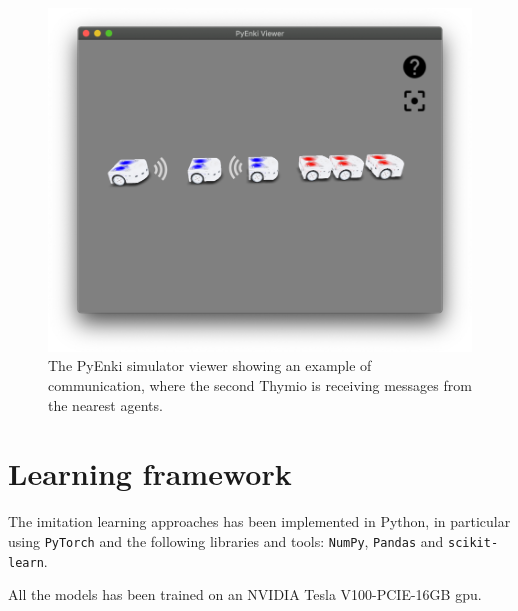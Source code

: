 \begin{figure}[h!tb]
	\centering
	\includegraphics[width=.6\textwidth]{contents/images/thymio-comm}
	\caption[Example of communication with the PyEnki simulator]{The PyEnki 
	simulator viewer showing an example of communication, 
	where the second Thymio is receiving messages from the nearest agents.}
	\label{fig:thymio comm}
\end{figure}

\section{Learning framework}
\label{sec:learning}
The imitation learning approaches has been implemented in Python, in particular  
using \texttt{PyTorch} and the following libraries and tools: \texttt{NumPy}, 
\texttt{Pandas} and \texttt{scikit-learn}.

All the models has been trained on an NVIDIA Tesla V100-PCIE-16GB \gls{gpu}.
